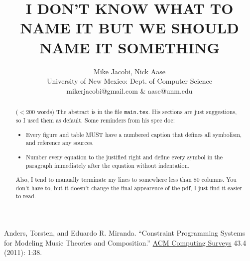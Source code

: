 \documentclass[12pt]{article}
\title{{\bf I DON'T KNOW WHAT TO NAME IT BUT WE SHOULD NAME IT SOMETHING}}
\author{Mike Jacobi, Nick Aase\\
University of New Mexico: Dept. of Computer Science\\
\normalsize  mikerjacobi@gmail.com \& aase@unm.edu}
\date{}
\begin{document}
\begin{sloppypar}

\maketitle

\renewcommand{\abstractname}{\Large Abstract}
\begin{abstract}
  \begin{singlespace}
  ($< 200$ words)
  \normalsize The abstract is in the file \texttt{main.tex}. His sections 
  are just suggestions, so I used them as default. Some reminders from his 
  spec doc:\\

\begin{itemize}
  \item
    Every figure and table MUST have a numbered caption that defines all 
    symbolism, and reference any sources.

  \item
    Number every equation to the justified right and define every symbol in 
    the paragraph immediately after the equation without indentation.\\

\end{itemize}

  Also, I tend to manually terminate my lines to somewhere less than 80
  columns. You don't have to, but it doesn't change the final appearence
  of the pdf, I just find it easier to read.

  \end{singlespace}
\end{abstract}









\end{sloppypar}

\begin{thebibliography}{9}

  Anders, Torsten, and Eduardo R. Miranda. ``Constraint Programming Systems for Modeling Music Theories and Composition.'' \underline{ACM Computing Surveys} 43.4 (2011): 1:38.

\end{thebibliography}
\end{document}
